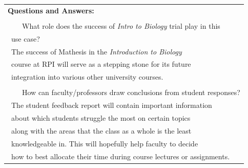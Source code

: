 \documentclass[12pt,a4paper]{article}
\newcommand{\tabitem}{\\~~\llap{\textbullet}~~}
\begin{document}
\begin{appendices}
\begin{table}[H]
\begin{tabular}{|p{13cm}|}
            \textbf{Questions and Answers:} \\\makecell[l]{
                \tabitem What role does the success of \textit{Intro to Biology} trial play in this
                    \\\quad~use case?
                    \\\quad~The success of Mathesis in the \textit{Introduction to Biology}
                    \\\quad~course at RPI will serve as a stepping stone for its future
                    \\\quad~integration into various other university courses.\\
                \tabitem How can faculty/professors draw conclusions from student responses?
                    \\\quad~The student feedback report will contain important information
                    \\\quad~about which students struggle the most on certain topics
                    \\\quad~along with the areas that the class as a whole is the least
                    \\\quad~knowledgeable in.  This will hopefully help faculty to decide
                    \\\quad~how to best allocate their time during course lectures or assignments.
            }\\\hline
        \end{tabular}
        \end{table}

    \end{appendices}
\end{document}
